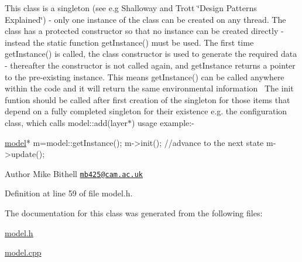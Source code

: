 This class is a singleton (see e.\+g Shalloway and Trott \char`\"{}\+Design Patterns Explained\char`\"{}) -\/ only one instance of the class can be created on any thread. The class has a protected constructor so that no instance can be created directly -\/ instead the static function get\+Instance() must be used. The first time get\+Instance() is called, the class constructor is used to generate the required data -\/ thereafter the constructor is not called again, and get\+Instance returns a pointer to the pre-\/existing instance. This means get\+Instance() can be called anywhere within the code and it will return the same environmental information~\newline
The init funtion should be called after first creation of the singleton for those items that depend on a fully completed singleton for their existence e.\+g. the configuration class, which calls model\+::add(layer$\ast$) usage example\+:-\/~\newline

\begin{DoxyCode}
\mbox{\hyperlink{classmodel}{model}}* m=model::getInstance();
m->init();
\textcolor{comment}{//advance to the next state}
m->update();
\end{DoxyCode}


\begin{DoxyAuthor}{Author}
Mike Bithell \href{mailto:mb425@cam.ac.uk}{\tt mb425@cam.\+ac.\+uk} 
\end{DoxyAuthor}


Definition at line 59 of file model.\+h.



The documentation for this class was generated from the following files\+:\begin{DoxyCompactItemize}
\item 
\mbox{\hyperlink{model_8h}{model.\+h}}\item 
\mbox{\hyperlink{model_8cpp}{model.\+cpp}}\end{DoxyCompactItemize}
